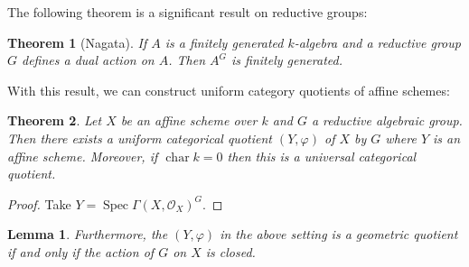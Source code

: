\documentclass[12pt]{report}
\newtheorem{theorem}{Theorem}[section]
\newtheorem{lemma}{Lemma}[section]
\theoremstyle{remark}
\theoremstyle{definition}
\newcommand{\Spec}[0]{\operatorname{Spec}}
\begin{document}
    The following theorem is a significant result on reductive groups:
    \begin{theorem}[Nagata]
        If $A$ is a finitely generated $k$-algebra and a reductive group $G$ defines a dual action on $A$. Then $A^G$ is finitely generated.
    \end{theorem}
    With this result, we can construct uniform category quotients of affine schemes:
    \begin{theorem}
        Let $X$ be an affine scheme over $k$ and $G$ a reductive algebraic group. Then there exists a uniform categorical quotient $(Y,\varphi)$ of $X$ by $G$ where $Y$ is an affine scheme. Moreover, if $\operatorname{char} k=0$ then this is a universal categorical quotient.
    \end{theorem}
    \begin{proof}
        Take $Y=\Spec \Gamma(X,\mathcal O_X)^G$.
    \end{proof}
    \begin{lemma}
        Furthermore, the $(Y, \varphi)$ in the above setting is a geometric quotient if and only if the action of $G$ on $X$ is closed.
    \end{lemma}
\end{document}
